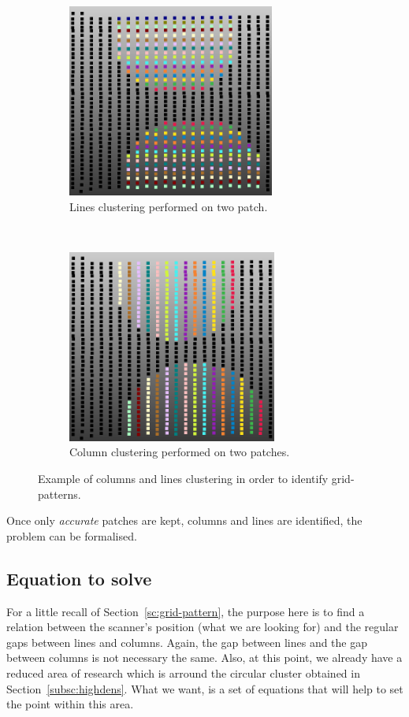\begin{figure}[t!]
  \centering
    \begin{subfigure}[t]{0.5\textwidth}
      \centering
        \includegraphics[height=2.5in]{img/grid-lines.png}
        \caption{Lines clustering performed on two patch.}
    \end{subfigure}%
    ~
    \begin{subfigure}[t]{0.5\textwidth}
      \centering
        \includegraphics[height=2.5in]{img/grid-cols.png}
        \caption{Column clustering performed on two patches.}
    \end{subfigure}
    \caption{Example of columns and lines clustering in order to identify grid-patterns.}
    \label{fig:line-col-cluster}
\end{figure}

Once only \emph{accurate} patches are kept, columns and lines are identified, the problem can be formalised.

\subsection{Equation to solve}
\label{subsc:eq}

For a little recall of Section~\ref{sc:grid-pattern}, the purpose here is to find a relation between the scanner's position (what we are looking for) and the regular gaps between lines and columns. Again, the gap between lines and the gap between columns is not necessary the same. Also, at this point, we already have a reduced area of research which is arround the circular cluster obtained in Section~\ref{subsc:highdens}. What we want, is a set of equations that will help
to set the point within this area.


